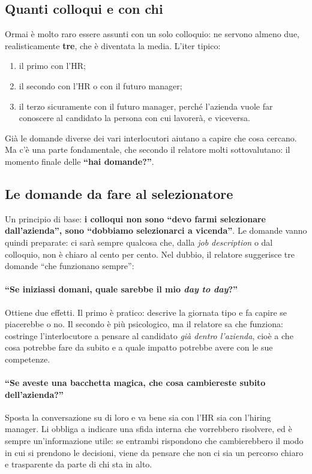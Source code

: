 \subsection{Quanti colloqui e con chi}

Ormai è molto raro essere assunti con un solo colloquio: ne servono almeno
due, realisticamente \textbf{tre}, che è diventata la media. L'iter tipico:
\begin{enumerate}
  \item il primo con l'HR;
  \item il secondo con l'HR o con il futuro manager;
  \item il terzo sicuramente con il futuro manager, perché l'azienda vuole far
        conoscere al candidato la persona con cui lavorerà, e viceversa.
\end{enumerate}
Già le domande diverse dei vari interlocutori aiutano a capire che cosa
cercano. Ma c'è una parte fondamentale, che secondo il relatore molti
sottovalutano: il momento finale delle \textbf{``hai domande?''}.

\subsection{Le domande da fare al selezionatore}

Un principio di base: \textbf{i colloqui non sono ``devo farmi selezionare
dall'azienda'', sono ``dobbiamo selezionarci a vicenda''}. Le domande vanno
quindi preparate: ci sarà sempre qualcosa che, dalla \emph{job description} o
dal colloquio, non è chiaro al cento per cento. Nel dubbio, il relatore
suggerisce tre domande ``che funzionano sempre'':

\paragraph{``Se iniziassi domani, quale sarebbe il mio \emph{day to day}?''}
Ottiene due effetti. Il primo è pratico: descrive la giornata tipo e fa capire
se piacerebbe o no. Il secondo è più psicologico, ma il relatore sa che
funziona: costringe l'interlocutore a pensare al candidato \emph{già dentro
l'azienda}, cioè a che cosa potrebbe fare da subito e a quale impatto potrebbe
avere con le sue competenze.

\paragraph{``Se aveste una bacchetta magica, che cosa cambiereste subito
dell'azienda?''} Sposta la conversazione su di loro e va bene sia con l'HR sia
con l'hiring manager. Li obbliga a indicare una sfida interna che vorrebbero
risolvere, ed è sempre un'informazione utile: se entrambi rispondono che
cambierebbero il modo in cui si prendono le decisioni, viene da pensare che non
ci sia un percorso chiaro e trasparente da parte di chi sta in alto.


